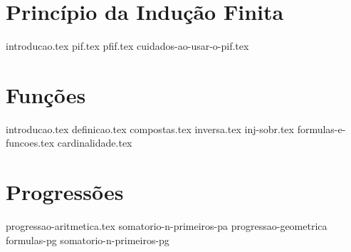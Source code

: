 \documentclass[a4paper,12pt, oneside]{book}
\begin{document}
    \chapter{Princípio da Indução Finita}
    {introducao.tex}
    {pif.tex}
    {pfif.tex}
    {cuidados-ao-usar-o-pif.tex}

    \chapter{Funções}
    {introducao.tex}
    {definicao.tex}
    {compostas.tex}
    {inversa.tex}
    {inj-sobr.tex}
    {formulas-e-funcoes.tex}
    {cardinalidade.tex}

    \chapter{Progressões}
    {progressao-aritmetica.tex}
    {somatorio-n-primeiros-pa}
    {progressao-geometrica}
    {formulas-pg}
    {somatorio-n-primeiros-pg}
\end{document}
